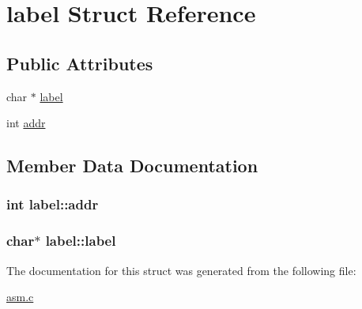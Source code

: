 \hypertarget{structlabel}{}\section{label Struct Reference}
\label{structlabel}
\subsection*{Public Attributes}
\begin{DoxyCompactItemize}
\item 
char $\ast$ \hyperlink{structlabel_a23bae4982501f1331a7e61c2b22ed4f3}{label}
\item 
int \hyperlink{structlabel_af670c52b4f6b3aeaadc0ec95334e6e52}{addr}
\end{DoxyCompactItemize}


\subsection{Member Data Documentation}
\subsubsection[{\texorpdfstring{addr}{addr}}]{\setlength{\rightskip}{0pt plus 5cm}int label\+::addr}\hypertarget{structlabel_af670c52b4f6b3aeaadc0ec95334e6e52}{}\label{structlabel_af670c52b4f6b3aeaadc0ec95334e6e52}
\subsubsection[{\texorpdfstring{label}{label}}]{\setlength{\rightskip}{0pt plus 5cm}char$\ast$ label\+::label}\hypertarget{structlabel_a23bae4982501f1331a7e61c2b22ed4f3}{}\label{structlabel_a23bae4982501f1331a7e61c2b22ed4f3}


The documentation for this struct was generated from the following file\+:\begin{DoxyCompactItemize}
\item 
\hyperlink{asm_8c}{asm.\+c}\end{DoxyCompactItemize}
